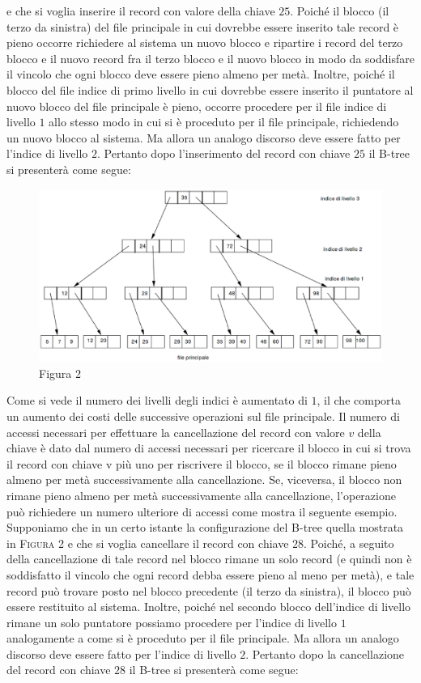e che si voglia inserire il record con valore della chiave $25$. Poiché il blocco (il terzo da sinistra) del
file principale in cui dovrebbe essere inserito tale record è pieno occorre richiedere al sistema un
nuovo blocco e ripartire i record del terzo blocco e il nuovo record fra il terzo blocco e il nuovo
blocco in modo da soddisfare il vincolo che ogni blocco deve essere pieno almeno per metà. Inoltre,
poiché il blocco del file indice di primo livello in cui dovrebbe essere inserito il puntatore al nuovo
blocco del file principale è pieno, occorre procedere per il file indice di livello $1$ allo stesso modo in
cui si è proceduto per il file principale, richiedendo un nuovo blocco al sistema. Ma allora un
analogo discorso deve essere fatto per l’indice di livello $2$. Pertanto dopo l’inserimento del record
con chiave $25$ il B-tree si presenterà come segue:

\begin{figure}[h!]
  \centering
  \includegraphics[width=430px]{img_5_3_4(2).eps}
  Figura 2
\end{figure}

Come si vede il numero dei livelli degli indici è aumentato di $1$, il che comporta un aumento dei
costi delle successive operazioni sul file principale.
Il numero di accessi necessari per effettuare la cancellazione del record con valore $v$ della chiave è
dato dal numero di accessi necessari per ricercare il blocco in cui si trova il record con chiave v più
uno per riscrivere il blocco, se il blocco rimane pieno almeno per metà successivamente alla
cancellazione. Se, viceversa, il blocco non rimane pieno almeno per metà successivamente alla
cancellazione, l’operazione può richiedere un numero ulteriore di accessi come mostra il seguente
esempio.\\
Supponiamo che in un certo istante la configurazione del B-tree quella mostrata in \textsc{Figura 2} e che si
voglia cancellare il record con chiave $28$. Poiché, a seguito della cancellazione di tale record nel
blocco rimane un solo record (e quindi non è soddisfatto il vincolo che ogni record debba essere
pieno al meno per metà), e tale record può trovare posto nel blocco precedente (il terzo da sinistra),
il blocco può essere restituito al sistema. Inoltre, poiché nel secondo blocco dell’indice di livello
rimane un solo puntatore possiamo procedere per l’indice di livello $1$ analogamente a come si è
proceduto per il file principale. Ma allora un analogo discorso deve essere fatto per l’indice di
livello $2$. Pertanto dopo la cancellazione del record con chiave $28$ il B-tree si presenterà come segue:


